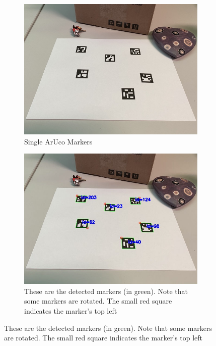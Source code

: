 \begin{figure}[htpb]
    \centering
    \begin{subfigure}[t]{0.3\textwidth}
        \centering
        \includegraphics[width=\textwidth]{media/chapter 5/singlemarkersoriginal.jpg}
        \caption{Single ArUco Markers}
        \label{fig:marker}
    \end{subfigure}\hfill
    \begin{subfigure}[t]{0.3\textwidth}
        \centering
        \includegraphics[width=\textwidth]{media/chapter 5/singlemarkersdetection.jpg}
        \caption{These are the detected markers (in green). 
        Note that some markers are rotated. 
        The small red square indicates the marker’s top left 
}
\end{subfigure}
\end{figure}
